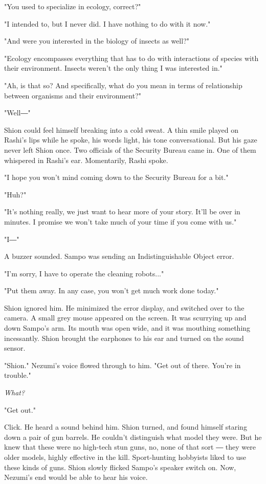 "You used to specialize in ecology, correct?"

"I intended to, but I never did. I have nothing to do with it now."

"And were you interested in the biology of insects as well?"

"Ecology encompasses everything that has to do with interactions of
species with their environment. Insects weren't the only thing I was
interested in."

"Ah, is that so? And specifically, what do you mean in terms of
relationship between organisms and their environment?"

"Well―"

Shion could feel himself breaking into a cold sweat. A thin smile played
on Rashi's lips while he spoke, his words light, his tone
conversational. But his gaze never left Shion once. Two officials of the
Security Bureau came in. One of them whispered in Rashi's ear.
Momentarily, Rashi spoke.

"I hope you won't mind coming down to the Security Bureau for a bit."

"Huh?"

"It's nothing really, we just want to hear more of your story. It'll be
over in minutes. I promise we won't take much of your time if you come
with us."

"I―"

A buzzer sounded. Sampo was sending an Indistinguishable Object error.

"I'm sorry, I have to operate the cleaning robots..."

"Put them away. In any case, you won't get much work done today."

Shion ignored him. He minimized the error display, and switched over to
the camera. A small grey mouse appeared on the screen. It was scurrying
up and down Sampo's arm. Its mouth was open wide, and it was mouthing
something incessantly. Shion brought the earphones to his ear and turned
on the sound sensor.

"Shion." Nezumi's voice flowed through to him. "Get out of there. You're
in trouble."

\emph{What?}

"Get out."

Click. He heard a sound behind him. Shion turned, and found himself
staring down a pair of gun barrels. He couldn't distinguish what model
they were. But he knew that these were no high-tech stun guns, no, none
of that sort ― they were older models, highly effective in the kill.
Sport-hunting hobbyists liked to use these kinds of guns. Shion slowly
flicked Sampo's speaker switch on. Now, Nezumi's end would be able to
hear his voice.


